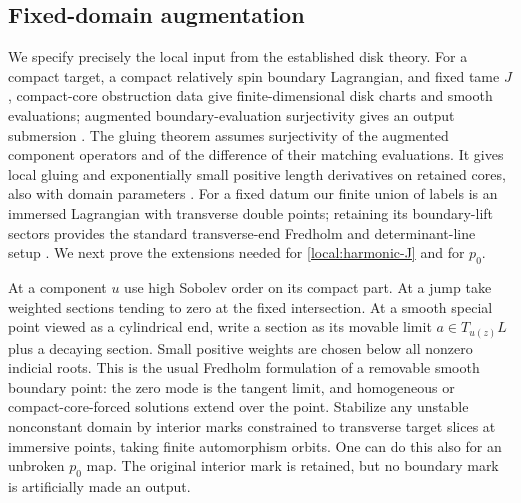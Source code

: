 \documentclass[11pt]{article}
\theoremstyle{definition}
\theoremstyle{remark}
\numberwithin{equation}{section}
\begin{document}
\subsection{Fixed-domain augmentation}

We specify precisely the local input from the established disk theory.
For a compact target, a compact relatively spin boundary Lagrangian,
and fixed tame $J$, compact-core obstruction data give finite-dimensional
disk charts and smooth evaluations; augmented boundary-evaluation
surjectivity gives an output submersion
\cite[Theorem~7.1, Condition~7.11, and Lemma~7.12]{fooo-i}.
The gluing theorem assumes surjectivity of the augmented component
operators and of the difference of their matching evaluations.
It gives local gluing and exponentially small positive length
derivatives on retained cores, also with domain parameters
\cite[Assumption~3.12, Theorems~3.13, 6.4, and 8.16--8.17]{fooo-decay}.
For a fixed datum our finite union of labels is an immersed Lagrangian
with transverse double points; retaining its boundary-lift sectors
provides the standard transverse-end Fredholm and determinant-line
setup \cite[Sections~4--5]{akaho-joyce}.  We next prove the extensions
needed for \eqref{local:harmonic-J} and for $p_0$.

At a component $u$ use high Sobolev order on its compact part.  At a
jump take weighted sections tending to zero at the fixed intersection.
At a smooth special point viewed as a cylindrical end, write a section
as its movable limit $a\in T_{u(z)}L$ plus a decaying section.  Small
positive weights are chosen below all nonzero indicial roots.  This
is the usual Fredholm formulation of a removable smooth boundary
point: the zero mode is the tangent limit, and homogeneous or
compact-core-forced solutions extend over the point.  Stabilize any
unstable nonconstant domain by interior marks constrained to transverse
target slices at immersive points, taking finite automorphism orbits.
One can do this also for an unbroken $p_0$ map.  The original interior
mark is retained, but no boundary mark is artificially made an output.
\end{document}
